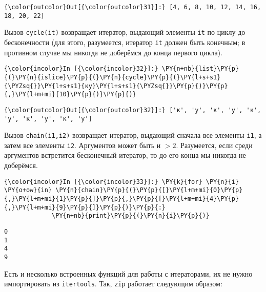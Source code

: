 \begin{Verbatim}[commandchars=\\\{\}]
{\color{outcolor}Out[{\color{outcolor}31}]:} [4, 6, 8, 10, 12, 14, 16, 18, 20, 22]
\end{Verbatim}
            
    Вызов \texttt{cycle(it)} возвращает итератор, выдающий элементы
\texttt{it} по циклу до бесконечности (для этого, разумеется, итератор
\texttt{it} должен быть конечным; в противном случае мы никогда не
доберёмся до конца первого цикла).

    \begin{Verbatim}[commandchars=\\\{\}]
{\color{incolor}In [{\color{incolor}32}]:} \PY{n+nb}{list}\PY{p}{(}\PY{n}{islice}\PY{p}{(}\PY{n}{cycle}\PY{p}{(}\PY{l+s+s1}{\PYZsq{}}\PY{l+s+s1}{ку}\PY{l+s+s1}{\PYZsq{}}\PY{p}{)}\PY{p}{,}\PY{l+m+mi}{10}\PY{p}{)}\PY{p}{)}
\end{Verbatim}


\begin{Verbatim}[commandchars=\\\{\}]
{\color{outcolor}Out[{\color{outcolor}32}]:} ['к', 'у', 'к', 'у', 'к', 'у', 'к', 'у', 'к', 'у']
\end{Verbatim}
            
    Вызов \texttt{chain(i1,i2)} возвращает итератор, выдающий сначала все
элементы \texttt{i1}, а затем все элементы \texttt{i2}. Аргументов может
быть и \(>2\). Разумеется, если среди аргументов встретится бесконечный
итератор, то до его конца мы никогда не доберёмся.

    \begin{Verbatim}[commandchars=\\\{\}]
{\color{incolor}In [{\color{incolor}33}]:} \PY{k}{for} \PY{n}{i} \PY{o+ow}{in} \PY{n}{chain}\PY{p}{(}\PY{p}{[}\PY{l+m+mi}{0}\PY{p}{,}\PY{l+m+mi}{1}\PY{p}{]}\PY{p}{,}\PY{p}{[}\PY{l+m+mi}{4}\PY{p}{,}\PY{l+m+mi}{9}\PY{p}{]}\PY{p}{)}\PY{p}{:}
             \PY{n+nb}{print}\PY{p}{(}\PY{n}{i}\PY{p}{)}
\end{Verbatim}


    \begin{Verbatim}[commandchars=\\\{\}]
0
1
4
9

    \end{Verbatim}

    Есть и несколько встроенных функций для работы с итераторами, их не
нужно импортировать из \texttt{itertools}. Так, \texttt{zip} работает
следующим образом:

